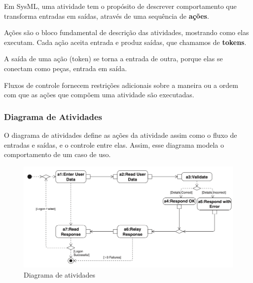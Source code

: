 Em SysML, uma atividade tem o propósito de descrever comportamento que transforma entradas em saídas, através de uma sequência de \textbf{ações}.

Ações são o bloco fundamental de descrição das atividades, mostrando como elas executam. Cada ação aceita entrada e produz saídas, que chamamos de \textbf{tokens}.

A saída de uma ação (token) se torna a entrada de outra, porque elas se conectam como peças, entrada em saída.

Fluxos de controle fornecem restrições adicionais sobre a maneira ou a ordem com que as ações que compõem uma atividade são executadas.

\subsubsection{Diagrama de Atividades}

O diagrama de atividades define as ações da atividade assim como o fluxo de entradas e saídas, e o controle entre elas. Assim, esse diagrama modela o comportamento de um caso de uso.

\begin{figure}[h]
\centering
\includegraphics[width=\textwidth,height=\textheight,keepaspectratio]{figures/diagrama-atividades-1.png}
\caption{Diagrama de atividades}
\label{fig:activity_diagram}
\end{figure}
